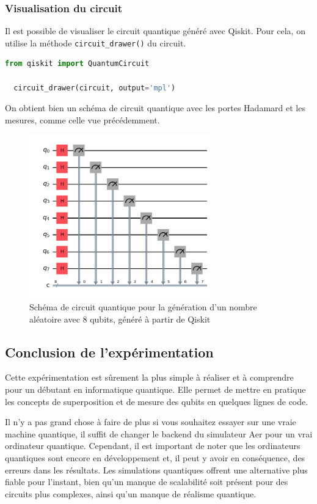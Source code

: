 \documentclass{article}
\begin{document}
\subsubsection{Visualisation du circuit}

Il est possible de visualiser le circuit quantique généré avec Qiskit. Pour cela, on utilise la méthode \texttt{circuit\_drawer()} du circuit.

\begin{lstlisting}[language=Python, style=mystyle, caption={Visualisation du circuit}]
  from qiskit import QuantumCircuit

  circuit_drawer(circuit, output='mpl')
\end{lstlisting}

On obtient bien un schéma de circuit quantique avec les portes Hadamard et les mesures, comme celle vue précédemment.

\begin{figure}[H]
  \centering
  \includegraphics[width=0.7\textwidth]{img/circuitPy.png}
  \caption{Schéma de circuit quantique pour la génération d'un nombre aléatoire avec 8 qubits, généré à partir de Qiskit}
\end{figure}


\subsection{Conclusion de l'expérimentation}

Cette expérimentation est sûrement la plus simple à réaliser et à comprendre pour un débutant en informatique quantique. Elle permet de mettre en pratique les concepts de superposition et de mesure des qubits en quelques lignes de code.

Il n'y a pas grand chose à faire de plus si vous souhaitez essayer sur une vraie machine quantique, il suffit de changer le backend du simulateur Aer pour un vrai ordinateur quantique. Cependant, il est important de noter que les ordinateurs quantiques sont encore en développement et, il peut y avoir en conséquence, des erreurs dans les résultats.
Les simulations quantiques offrent une alternative plus fiable pour l'instant, bien qu'un manque de scalabilité soit présent pour des circuits plus complexes, ainsi qu'un manque de réalisme quantique.
\end{document}

